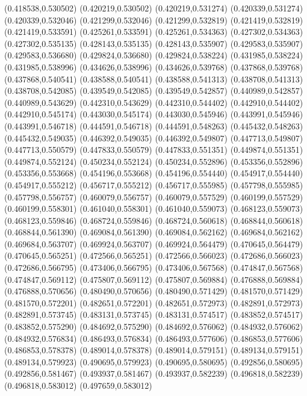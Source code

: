 (0.418538,0.530502)
(0.420219,0.530502)
(0.420219,0.531274)
(0.420339,0.531274)
(0.420339,0.532046)
(0.421299,0.532046)
(0.421299,0.532819)
(0.421419,0.532819)
(0.421419,0.533591)
(0.425261,0.533591)
(0.425261,0.534363)
(0.427302,0.534363)
(0.427302,0.535135)
(0.428143,0.535135)
(0.428143,0.535907)
(0.429583,0.535907)
(0.429583,0.536680)
(0.429824,0.536680)
(0.429824,0.538224)
(0.431985,0.538224)
(0.431985,0.538996)
(0.434626,0.538996)
(0.434626,0.539768)
(0.437868,0.539768)
(0.437868,0.540541)
(0.438588,0.540541)
(0.438588,0.541313)
(0.438708,0.541313)
(0.438708,0.542085)
(0.439549,0.542085)
(0.439549,0.542857)
(0.440989,0.542857)
(0.440989,0.543629)
(0.442310,0.543629)
(0.442310,0.544402)
(0.442910,0.544402)
(0.442910,0.545174)
(0.443030,0.545174)
(0.443030,0.545946)
(0.443991,0.545946)
(0.443991,0.546718)
(0.444591,0.546718)
(0.444591,0.548263)
(0.445432,0.548263)
(0.445432,0.549035)
(0.446392,0.549035)
(0.446392,0.549807)
(0.447713,0.549807)
(0.447713,0.550579)
(0.447833,0.550579)
(0.447833,0.551351)
(0.449874,0.551351)
(0.449874,0.552124)
(0.450234,0.552124)
(0.450234,0.552896)
(0.453356,0.552896)
(0.453356,0.553668)
(0.454196,0.553668)
(0.454196,0.554440)
(0.454917,0.554440)
(0.454917,0.555212)
(0.456717,0.555212)
(0.456717,0.555985)
(0.457798,0.555985)
(0.457798,0.556757)
(0.460079,0.556757)
(0.460079,0.557529)
(0.460199,0.557529)
(0.460199,0.558301)
(0.461040,0.558301)
(0.461040,0.559073)
(0.468123,0.559073)
(0.468123,0.559846)
(0.468724,0.559846)
(0.468724,0.560618)
(0.468844,0.560618)
(0.468844,0.561390)
(0.469084,0.561390)
(0.469084,0.562162)
(0.469684,0.562162)
(0.469684,0.563707)
(0.469924,0.563707)
(0.469924,0.564479)
(0.470645,0.564479)
(0.470645,0.565251)
(0.472566,0.565251)
(0.472566,0.566023)
(0.472686,0.566023)
(0.472686,0.566795)
(0.473406,0.566795)
(0.473406,0.567568)
(0.474847,0.567568)
(0.474847,0.569112)
(0.475807,0.569112)
(0.475807,0.569884)
(0.476888,0.569884)
(0.476888,0.570656)
(0.480490,0.570656)
(0.480490,0.571429)
(0.481570,0.571429)
(0.481570,0.572201)
(0.482651,0.572201)
(0.482651,0.572973)
(0.482891,0.572973)
(0.482891,0.573745)
(0.483131,0.573745)
(0.483131,0.574517)
(0.483852,0.574517)
(0.483852,0.575290)
(0.484692,0.575290)
(0.484692,0.576062)
(0.484932,0.576062)
(0.484932,0.576834)
(0.486493,0.576834)
(0.486493,0.577606)
(0.486853,0.577606)
(0.486853,0.578378)
(0.489014,0.578378)
(0.489014,0.579151)
(0.489134,0.579151)
(0.489134,0.579923)
(0.490695,0.579923)
(0.490695,0.580695)
(0.492856,0.580695)
(0.492856,0.581467)
(0.493937,0.581467)
(0.493937,0.582239)
(0.496818,0.582239)
(0.496818,0.583012)
(0.497659,0.583012)
